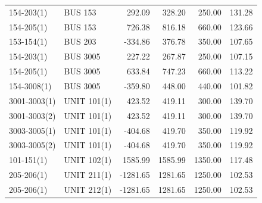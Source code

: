\documentclass[10pt]{report}
\begin{document}
\begin{table}[H]
{\begin{tabular}{llrrrr}
154-203(1) & BUS 153 & 292.09 & 328.20 & 250.00 & 131.28 \\
154-205(1) & BUS 153 & 726.38 & 816.18 & 660.00 & 123.66 \\
153-154(1) & BUS 203 & -334.86 & 376.78 & 350.00 & 107.65 \\
154-203(1) & BUS 3005 & 227.22 & 267.87 & 250.00 & 107.15 \\
154-205(1) & BUS 3005 & 633.84 & 747.23 & 660.00 & 113.22 \\
154-3008(1) & BUS 3005 & -359.80 & 448.00 & 440.00 & 101.82 \\
3001-3003(1) & UNIT 101(1) & 423.52 & 419.11 & 300.00 & 139.70 \\
3001-3003(2) & UNIT 101(1) & 423.52 & 419.11 & 300.00 & 139.70 \\
3003-3005(1) & UNIT 101(1) & -404.68 & 419.70 & 350.00 & 119.92 \\
3003-3005(2) & UNIT 101(1) & -404.68 & 419.70 & 350.00 & 119.92 \\
101-151(1) & UNIT 102(1) & 1585.99 & 1585.99 & 1350.00 & 117.48 \\
205-206(1) & UNIT 211(1) & -1281.65 & 1281.65 & 1250.00 & 102.53 \\
205-206(1) & UNIT 212(1) & -1281.65 & 1281.65 & 1250.00 & 102.53 \\
\bottomrule
\end{tabular}}
\end{table}
\end{document}
